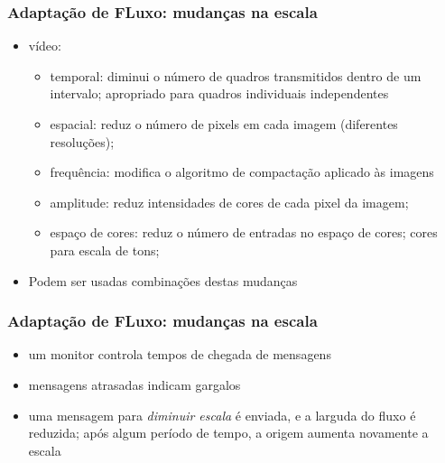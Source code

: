 \documentclass[]{beamer}
\begin{document}
\begin{frame}
 \frametitle{Adaptação de FLuxo: mudanças na escala}
 \begin{itemize}
   \item vídeo: 
     \begin{itemize}
       \item temporal: diminui o número de quadros transmitidos dentro de um intervalo;
apropriado para quadros individuais independentes
        \item espacial: reduz o número de pixels em cada imagem (diferentes resoluções); 
        \item frequência: modifica o algoritmo de compactação aplicado às imagens
        \item amplitude: reduz intensidades de cores de cada pixel da imagem;
        \item espaço de cores: reduz o número de entradas no espaço de cores; cores para
escala de tons;
     \end{itemize}
     \item Podem ser usadas combinações destas mudanças
  \end{itemize}
\end{frame}

\begin{frame}
 \frametitle{Adaptação de FLuxo: mudanças na escala}
 \begin{itemize}
   \item um monitor controla tempos de chegada de mensagens
   \item mensagens atrasadas indicam gargalos
   \item uma mensagem para \emph{diminuir escala} é enviada, e a larguda do fluxo é
reduzida; após algum período de tempo, a origem aumenta novamente a escala
  \end{itemize}
\end{frame}
\end{document}
